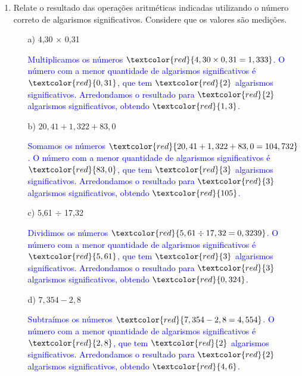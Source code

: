 \documentclass[a4paper, 12pt]{article}
\begin{document}
\begin{enumerate}
    \item Relate o resultado das operações aritméticas indicadas utilizando o número correto de algarismos significativos. Considere que os valores são medições.
          \begin{enumerate}[align=left, labelsep=-0.5em]
              \item[a)] 4,30 \(\times\) 0,31

                    \textcolor{blue}{
                        Multiplicamos os números \(\textcolor{red}{4,30 \times 0,31 = 1,333}\). O número com a menor quantidade de algarismos significativos é \(\textcolor{red}{0,31}\), que tem \(\textcolor{red}{2}\) algarismos significativos. Arredondamos o resultado para \(\textcolor{red}{2}\) algarismos significativos, obtendo \(\textcolor{red}{1,3}\).
                    }

              \item[b)] \(20,41 + 1,322 + 83,0\)

                    \textcolor{blue}{
                        Somamos os números \(\textcolor{red}{20,41 + 1,322 + 83,0 = 104,732}\). O número com a menor quantidade de algarismos significativos é \(\textcolor{red}{83,0}\), que tem \(\textcolor{red}{3}\) algarismos significativos. Arredondamos o resultado para \(\textcolor{red}{3}\) algarismos significativos, obtendo \(\textcolor{red}{105}\).
                    }

              \item[c)] 5,61 \(\div\) 17,32

                    \textcolor{blue}{
                        Dividimos os números \(\textcolor{red}{5,61 \div 17,32 = 0,3239}\). O número com a menor quantidade de algarismos significativos é \(\textcolor{red}{5,61}\), que tem \(\textcolor{red}{3}\) algarismos significativos. Arredondamos o resultado para \(\textcolor{red}{3}\) algarismos significativos, obtendo \(\textcolor{red}{0,324}\).
                    }

              \item[d)] \(7,354 - 2,8\)

                    \textcolor{blue}{
                        Subtraímos os números \(\textcolor{red}{7,354 - 2,8 = 4,554}\). O número com a menor quantidade de algarismos significativos é \(\textcolor{red}{2,8}\), que tem \(\textcolor{red}{2}\) algarismos significativos. Arredondamos o resultado para \(\textcolor{red}{2}\) algarismos significativos, obtendo \(\textcolor{red}{4,6}\).
                    }


\end{enumerate}
\end{enumerate}
\end{document}
